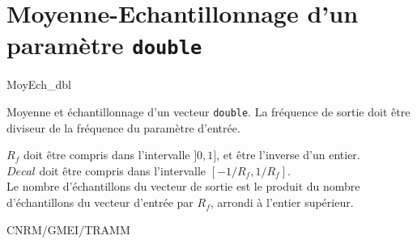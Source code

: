 %
\section{Moyenne-Echantillonnage d'un param\`etre {\tt double}}

 {\sf MoyEch\_dbl}

Moyenne et \'echantillonnage d'un vecteur {\tt double}. La
fr\'equence de sortie doit \^etre diviseur de la 
fr\'equence du param\`etre d'entr\'ee. 

\bigskip






$R_f$ doit \^etre compris dans l'intervalle $]0, 1]$,
et \^etre l'inverse d'un entier. \\
$Decal$ doit \^etre compris dans l'intervalle $[-1/R_f, 1/R_f]$.\\
Le nombre d'\'echantillons du vecteur de sortie est le produit du
nombre d'\'echantillons du vecteur d'entr\'ee par $R_f$, arrondi
\`a l'entier sup\'erieur.

CNRM/GMEI/TRAMM

